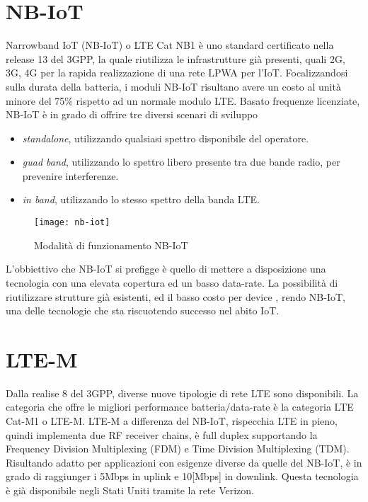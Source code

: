 \section{NB-IoT}
Narrowband IoT (NB-IoT) o LTE Cat NB1 è uno standard certificato nella release 13 del 3GPP, la
quale riutilizza le infrastrutture già presenti, quali 2G, 3G, 4G per la rapida
realizzazione di una rete LPWA per l'IoT.
Focalizzandosi sulla durata della batteria, i moduli NB-IoT risultano avere un
costo al unità minore del 75\% rispetto ad un normale modulo LTE.
Basato frequenze licenziate, NB-IoT è in grado di
offrire tre diversi scenari di sviluppo \cite{NB-white_paper}
\begin{itemize}
\item \emph{standalone}, utilizzando qualsiasi spettro disponibile del
operatore.
\item \emph{guad band}, utilizzando lo spettro libero presente tra due bande
radio, per prevenire interferenze.
\item \emph{in band}, utilizzando lo stesso spettro della banda LTE.
\end{itemize}
\begin{figure}[h]
    \centering 
        \texttt{[image: nb-iot]}
    \caption{Modalità di funzionamento NB-IoT}
\end{figure}
L'obbiettivo che NB-IoT si prefigge è quello di mettere a disposizione una
tecnologia con una elevata copertura ed un basso data-rate. La possibilità di
riutilizzare strutture già esistenti, ed il basso costo per device , rendo
NB-IoT, una delle tecnologie che sta riscuotendo successo nel abito IoT.



\section{LTE-M}
Dalla realise 8 del 3GPP, diverse nuove tipologie di rete LTE sono disponibili.
La categoria che offre le migliori performance batteria/data-rate è la categoria
LTE Cat-M1 o LTE-M.
LTE-M a differenza del NB-IoT, rispecchia LTE in pieno, quindi implementa due RF
receiver chains, è full duplex supportando la Frequency Division Multiplexing
(FDM) e Time Division Multiplexing (TDM). Risultando adatto per applicazioni con
esigenze diverse da quelle del NB-IoT, è in grado di raggiunger i 5Mbps in
uplink e 10[Mbps] in downlink. Questa tecnologia è già disponibile negli Stati
Uniti tramite la rete Verizon.

